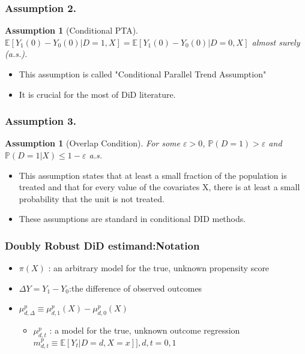 \documentclass{beamer}
\newtheorem{assumption}[thm]{Assumption}
\begin{document}
\begin{frame}\frametitle{Assumption 2.}
    \begin{assumption}[Conditional PTA]
        $\mathbb{E}[Y_{1}(0) - Y_{0}(0)| D = 1, X] = \mathbb{E}[Y_{1}(0) - Y_{0}(0)|D = 0, X]$ almost surely (a.s.).
    \end{assumption}
    \begin{itemize}
        \item This assumption is called "Conditional Parallel Trend Assumption"
        \item It is crucial for the most of DiD literature.
    \end{itemize}
\end{frame}

\begin{frame}\frametitle{Assumption 3.}
    \begin{assumption}[Overlap Condition]
        For some $\varepsilon > 0$, $\mathbb{P}(D = 1) > \varepsilon$ and $\mathbb{P}(D = 1|X) \leq 1 - \varepsilon$ a.s.
    \end{assumption}
    \begin{itemize}
        \item This assumption states that at least a small fraction of the population is treated and that for every value of the covariates X, there is at least a small probability that the unit is not treated.%
        \item These assumptions are standard in conditional DID methods.
    \end{itemize}
\end{frame}

\begin{frame}\frametitle{Doubly Robust DiD estimand:Notation}
    \begin{itemize}
        \item $\pi(X)$ : an arbitrary model for the true, unknown propensity score
        \item $\Delta Y = Y_{1} - Y_{0}$:the difference of observed outcomes
        \item $\mu ^{p}_{d,\Delta} \equiv \mu ^{p}_{d,1}(X) - \mu ^{p}_{d,0}(X)$
        \begin{itemize}
            \item $\mu ^{p}_{d,t}$ : a model for the true, unknown outcome regression $m^{p}_{d,t} \equiv \mathbb{E}[Y_{t}|D = d, X = x]],d,t = 0,1$
        \end{itemize}
    \end{itemize}
\end{frame}
\end{document}
